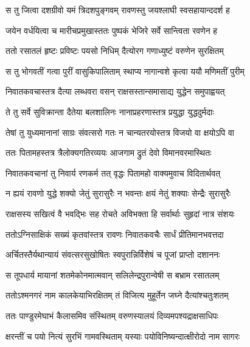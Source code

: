 
\twolineshloka
{स तु जित्वा दशग्रीवो यमं त्रिदशपुङ्गवम्}
{रावणस्तु जयश्लाघी स्वसहायान्ददर्श ह} %

\twolineshloka
{जयेन वर्धयित्वा च मारीचप्रमुखास्ततः}
{पुष्पकं भेजिरे सर्वे सान्त्विता रवणेन ह} %

\twolineshloka
{ततो रसातलं हृष्टः प्रविष्टः पयसो निधिम्}
{दैत्योरग गणाध्युष्टं वरुणेन सुरक्षितम्} %

\twolineshloka
{स तु भोगवतीं गत्वा पुरीं वासुकिपालिताम्}
{स्थाप्य नागान्वशे कृत्वा ययौ मणिमतीं पुरीम्} %

\twolineshloka
{निवातकवचास्तत्र दैत्या लब्धवरा वसन्}
{राक्षसस्तान्समासाद्य युद्धेन समुपाह्वयत्} %

\twolineshloka
{ते तु सर्वे सुविक्रान्ता दैतेया बलशालिनः}
{नानाप्रहरणास्तत्र प्रयुद्धा युद्धदुर्मदाः} %

\twolineshloka
{तेषां तु युध्यमानानां साग्रः संवत्सरो गतः}
{न चान्यतरयोस्तत्र विजयो वा क्षयोऽपि वा} %

\twolineshloka
{ततः पितामहस्तत्र त्रैलोक्यगतिरव्ययः}
{आजगाम द्रुतं देवो विमानवरमास्थितः} %

\twolineshloka
{निवातकवचानां तु निवार्य रणकर्म तत्}
{वृद्धः पितामहो वाक्यमुवाच विदितार्थवत्} %

\twolineshloka
{न ह्ययं रावणो युद्धे शक्यो जेतुं सुरासुरैः}
{न भवन्तः क्षयं नेतुं शक्याः सेन्द्रैः सुरासुरैः} %

\twolineshloka
{राक्षसस्य सखित्वं वै भवद्भिः सह रोचते}
{अविभक्ता हि सर्वार्थाः सुहृदां नात्र संशयः} %

\twolineshloka
{ततोऽग्निसाक्षिकं सख्यं कृतवांस्तत्र रावणः}
{निवातकवचैः सार्धं प्रीतिमानभवत्तदा} %

\twolineshloka
{अर्चितस्तैर्यथान्यायं संवत्सरसुखोषितः}
{स्वपुरान्निर्विशेषं च पूजां प्राप्तो दशाननः} %

\twolineshloka
{स तूपधार्य मायानां शतमेकोनमात्मवान्}
{सलिलेन्द्रपुरान्वेषी स बभ्राम रसातलम्} %

\twolineshloka
{ततोऽश्मनगरं नाम कालकेयाभिरक्षितम्}
{तं विजित्य मुहूर्तेन जघ्ने दैत्यांश्चतुःशतम्} %

\twolineshloka
{ततः पाण्डुरमेघाभं कैलासमिव संस्थितम्}
{वरुणस्यालयं दिव्यमपश्यद्राक्षसाधिपः} %

\twolineshloka
{क्षरन्तीं च पयो नित्यं सुरभिं गामवस्थिताम्}
{यस्याः पयोविनिष्यन्दात्क्षीरोदो नाम सागरः} %

